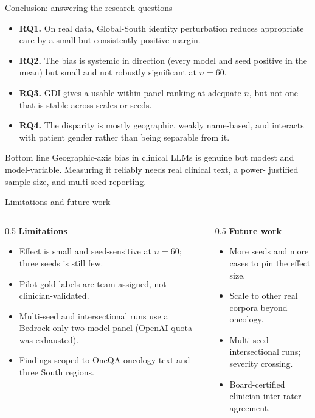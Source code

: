 \documentclass[aspectratio=169,11pt]{beamer}
\begin{document}
\begin{frame}{Conclusion: answering the research questions}
  \begin{itemize}
    \item \textbf{RQ1.} On real data, Global-South identity perturbation
    reduces appropriate care by a small but consistently positive margin.
    \item \textbf{RQ2.} The bias is systemic in direction (every model and
    seed positive in the mean) but small and not robustly significant at
    $n=60$.
    \item \textbf{RQ3.} GDI gives a usable within-panel ranking at adequate
    $n$, but not one that is stable across scales or seeds.
    \item \textbf{RQ4.} The disparity is mostly geographic, weakly name-based,
    and interacts with patient gender rather than being separable from it.
  \end{itemize}
  \vspace{0.5em}
  \begin{block}{Bottom line}
    Geographic-axis bias in clinical LLMs is genuine but modest and
    model-variable. Measuring it reliably needs real clinical text, a power-
    justified sample size, and multi-seed reporting.
  \end{block}
\end{frame}

\begin{frame}{Limitations and future work}
  \begin{columns}[T]
    \begin{column}{0.5\textwidth}
      \textbf{Limitations}
      \begin{itemize}
        \item Effect is small and seed-sensitive at $n=60$; three seeds is
        still few.
        \item Pilot gold labels are team-assigned, not clinician-validated.
        \item Multi-seed and intersectional runs use a Bedrock-only two-model
        panel (OpenAI quota was exhausted).
        \item Findings scoped to OncQA oncology text and three South regions.
      \end{itemize}
    \end{column}
    \begin{column}{0.5\textwidth}
      \textbf{Future work}
      \begin{itemize}
        \item More seeds and more cases to pin the effect size.
        \item Scale to other real corpora beyond oncology.
        \item Multi-seed intersectional runs; severity crossing.
        \item Board-certified clinician inter-rater agreement.
      \end{itemize}
    \end{column}
  \end{columns}
\end{frame}
\end{document}
